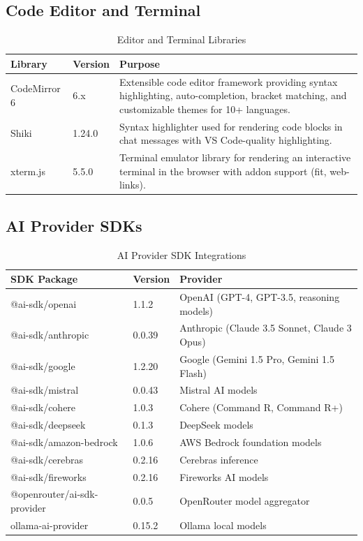 \documentclass[12pt,a4paper,openany]{report}
\begin{document}
\subsection{Code Editor and Terminal}

\begin{table}[H]
\centering
\caption{Editor and Terminal Libraries}
\label{tab:editor-libs}
\begin{tabular}{|p{4cm}|p{2cm}|p{6cm}|}
\hline
\textbf{Library} & \textbf{Version} & \textbf{Purpose} \\
\hline
CodeMirror 6 & 6.x & Extensible code editor framework providing syntax highlighting, auto-completion, bracket matching, and customizable themes for 10+ languages. \\
\hline
Shiki & 1.24.0 & Syntax highlighter used for rendering code blocks in chat messages with VS Code-quality highlighting. \\
\hline
xterm.js & 5.5.0 & Terminal emulator library for rendering an interactive terminal in the browser with addon support (fit, web-links). \\
\hline
\end{tabular}
\end{table}

\subsection{AI Provider SDKs}

\begin{table}[H]
\centering
\caption{AI Provider SDK Integrations}
\label{tab:ai-sdks}
\begin{tabular}{|p{4cm}|p{2cm}|p{6cm}|}
\hline
\textbf{SDK Package} & \textbf{Version} & \textbf{Provider} \\
\hline
@ai-sdk/openai & 1.1.2 & OpenAI (GPT-4, GPT-3.5, reasoning models) \\
\hline
@ai-sdk/anthropic & 0.0.39 & Anthropic (Claude 3.5 Sonnet, Claude 3 Opus) \\
\hline
@ai-sdk/google & 1.2.20 & Google (Gemini 1.5 Pro, Gemini 1.5 Flash) \\
\hline
@ai-sdk/mistral & 0.0.43 & Mistral AI models \\
\hline
@ai-sdk/cohere & 1.0.3 & Cohere (Command R, Command R+) \\
\hline
@ai-sdk/deepseek & 0.1.3 & DeepSeek models \\
\hline
@ai-sdk/amazon-bedrock & 1.0.6 & AWS Bedrock foundation models \\
\hline
@ai-sdk/cerebras & 0.2.16 & Cerebras inference \\
\hline
@ai-sdk/fireworks & 0.2.16 & Fireworks AI models \\
\hline
@openrouter/ai-sdk-provider & 0.0.5 & OpenRouter model aggregator \\
\hline
ollama-ai-provider & 0.15.2 & Ollama local models \\
\hline
\end{tabular}
\end{table}
\end{document}

